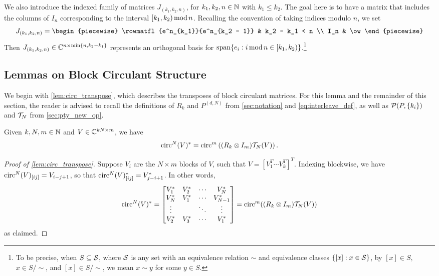 We also introduce the indexed family of matrices $J_{(k_1, k_2, n)}$, for $k_1, k_2, n \in \mathbb{N}$ with $k_1 \le k_2$.  The goal here is to have a matrix that includes the columns of $I_n$ corresponding to the interval $[k_1, k_2) \operatorname{\mathbin{mod}} n$.  Recalling the convention of taking indices modulo $n$, we set \begin{equation} J_{(k_1, k_2, n)} = \begin{piecewise} \rowmatfl{e^n_{k_1}}{e^n_{k_2 - 1}} & k_2 - k_1 < n \\ I_n & \ow \end{piecewise} \label{eq:circ_mod_mat} \end{equation}  Then $J_{(k_1, k_2, n)} \in \mathbb{C}^{n \times \min\{n, k_2 - k_1\}}$ represents an orthogonal basis for $\operatorname{span}\{e_i : i \operatorname{\mathbin{mod}} n \in [k_1, k_2)\}$.\footnote{To be precise, when $S \subseteq \mathcal{S}$, where $\mathcal{S}$ is any set with an equivalence relation $\sim$ and equivalence classes $\{[x] : x \in \mathcal{S}\}$, by $[x] \in S,$ $x \in S / \sim$, and $[x] \in S / \sim$, we mean $x \sim y$ for some $y \in S$.}

\subsection{Lemmas on Block Circulant Structure}
\label{sec:ptych_lem}
We begin with \cref{lem:circ_transpose}, which describes the transposes of block circulant matrices.  For this lemma and the remainder of this section, the reader is advised to recall the definitions of $R_k$ and $P^{(d, N)}$ from \cref{sec:notation} and \eqref{eq:interleave_def}, as well as $\mathcal{P}(P, \{k_i\})$ and $\mathcal{T}_N$ from \cref{sec:pty_new_op}.%
\begin{lemma}
\label{lem:circ_transpose} Given $k, N, m \in \mathbb{N}$ and $V \in \mathbb{C}^{kN \times m}$, we have \[\operatorname{circ}^N(V)^* = \operatorname{circ}^m\left( (R_k \otimes I_m) \mathcal{T}_N(V) \right).\] 
\end{lemma}
\begin{proof}[Proof of \cref{lem:circ_transpose}]
  Suppose $V_i$ are the $N \times m$ blocks of $V$, such that $V = \left[V_1^T \cdots V_k^T\right]^T$.  Indexing blockwise, we have $\operatorname{circ}^N(V)_{[ij]} = V_{i - j + 1}$, so that $\operatorname{circ}^N(V)^*_{[ij]} = V_{j - i + 1}^*$.  In other words,
  \[
  \operatorname{circ}^N(V)^* = \begin{bmatrix} V_1^* & V_2^* & \cdots & V_N^* \\ V_N^* & V_1^* & \cdots & V_{N - 1}^* \\ \vdots & & \ddots & \vdots \\ V_2^* & V_3^* & \cdots & V_1^* \end{bmatrix} = \operatorname{circ}^m((R_k \otimes I_m) \mathcal{T}_N(V) )
  \]
  as claimed.  
\end{proof}

